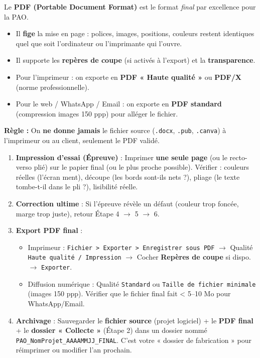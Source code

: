 \documentclass[11pt]{article}
\begin{document}
\begin{propriete}
Le \textbf{PDF (Portable Document Format)} est le format \emph{final} par excellence pour la PAO.
\begin{itemize}
    \item Il \textbf{fige} la mise en page : polices, images, positions, couleurs restent identiques quel que soit l'ordinateur ou l'imprimante qui l'ouvre.
    \item Il supporte les \textbf{repères de coupe} (si activés à l'export) et la \textbf{transparence}.
    \item Pour l'imprimeur : on exporte en \textbf{PDF « Haute qualité »} ou \textbf{PDF/X} (norme professionnelle).
    \item Pour le web / WhatsApp / Email : on exporte en \textbf{PDF standard} (compression images 150 ppp) pour alléger le fichier.
\end{itemize}
\textbf{Règle :} On \textbf{ne donne jamais} le fichier source (\texttt{.docx}, \texttt{.pub}, \texttt{.canva}) à l'imprimeur ou au client, seulement le PDF validé.
\end{propriete}

\begin{methode}
\begin{enumerate}
    \item \textbf{Impression d'essai (Épreuve)} : Imprimer \textbf{une seule page} (ou le recto-verso plié) sur le papier final (ou le plus proche possible). Vérifier : couleurs réelles (l'écran ment), découpe (les bords sont-ils nets ?), pliage (le texte tombe-t-il dans le pli ?), lisibilité réelle.
    \item \textbf{Correction ultime} : Si l'épreuve révèle un défaut (couleur trop foncée, marge trop juste), retour Étape 4 $\rightarrow$ 5 $\rightarrow$ 6.
    \item \textbf{Export PDF final} :
    \begin{itemize}
        \item Imprimeur : \texttt{Fichier > Exporter > Enregistrer sous PDF} $\rightarrow$ Qualité \texttt{Haute qualité / Impression} $\rightarrow$ Cocher \textbf{Repères de coupe} si dispo. $\rightarrow$ \texttt{Exporter}.
        \item Diffusion numérique : Qualité \texttt{Standard} ou \texttt{Taille de fichier minimale} (images 150 ppp). Vérifier que le fichier final fait < 5--10 Mo pour WhatsApp/Email.
    \end{itemize}
    \item \textbf{Archivage} : Sauvegarder le \textbf{fichier source} (projet logiciel) + le \textbf{PDF final} + le \textbf{dossier « Collecte »} (Étape 2) dans un dossier nommé \texttt{PAO\_NomProjet\_AAAAMMJJ\_FINAL}. C'est votre « dossier de fabrication » pour réimprimer ou modifier l'an prochain.
\end{enumerate}
\end{methode}
\end{document}
